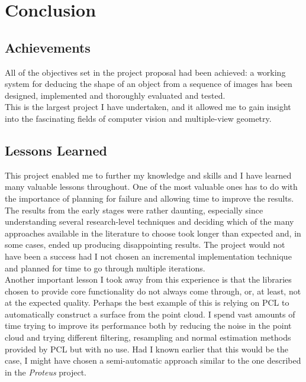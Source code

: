 \documentclass[12pt,a4paper,twoside,openright]{report}
\begin{document}
\chapter{Conclusion}


\section{Achievements}
All of the objectives set in the project proposal had been achieved: a working system for deducing the shape of an object from a sequence of images has been designed, implemented and thoroughly evaluated and tested.\\
\linebreak
This is the largest project I have undertaken, and it allowed me to gain insight into the fascinating fields of computer vision and multiple-view geometry. 

\section{Lessons Learned}
This project enabled me to further my knowledge and skills and I have learned many valuable lessons throughout. One of the most valuable ones has to do with the importance of planning for failure and allowing time to improve the results. The results from the early stages were rather daunting, especially since understanding several research-level techniques and deciding which of the many approaches available in the literature to choose took longer than expected and, in some cases, ended up producing disappointing results. The project would not have been a success had I not chosen an incremental implementation technique and planned for time to go through multiple iterations.\\
\linebreak
Another important lesson I took away from this experience is that the libraries chosen to provide core functionality do not always come through, or, at least,  not at the expected quality. Perhaps the best example of this is relying on PCL to automatically construct a surface from the point cloud. I spend vast amounts of time trying to improve its performance both by reducing the noise in the point cloud and trying different filtering, resampling and normal estimation methods provided by PCL but with no use. Had I known earlier that this would be the case, I might have chosen a semi-automatic approach similar to the one described in the \emph{Proteus}\cite{ProteusInteractiveSFM} project.
\end{document}

